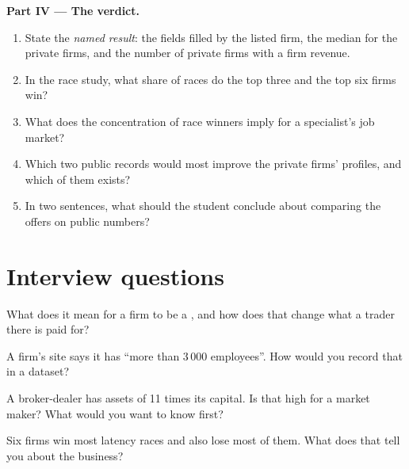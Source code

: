 \begin{problem}
\medskip\noindent\textbf{Part IV --- The verdict.}
\begin{enumerate}[resume]
\item State the \emph{named result}: the fields filled by the listed firm, the median for the private firms, and the
number of private firms with a firm revenue.
\item In the race study, what share of races do the top three and the top six firms win?
\item What does the concentration of race winners imply for a specialist's job market?
\item Which two public records would most improve the private firms' profiles, and which of them exists?
\item In two sentences, what should the student conclude about comparing the offers on public numbers?
\end{enumerate}
\end{problem}

\section{Interview questions}

\begin{interviewq}\label{iq:in:proprietary-market-makers-and-high-frequency-firms:1}
What does it mean for a firm to be a , and how does that change what a trader there is paid
for?
\end{interviewq}

\begin{interviewq}\label{iq:in:proprietary-market-makers-and-high-frequency-firms:2}
A firm's site says it has ``more than 3\,000 employees''. How would you record that in a dataset?
\end{interviewq}

\begin{interviewq}\label{iq:in:proprietary-market-makers-and-high-frequency-firms:3}
A broker-dealer has assets of 11 times its capital. Is that high for a market maker? What would you want to know first?
\end{interviewq}

\begin{interviewq}\label{iq:in:proprietary-market-makers-and-high-frequency-firms:4}
Six firms win most latency races and also lose most of them. What does that tell you about the business?
\end{interviewq}

